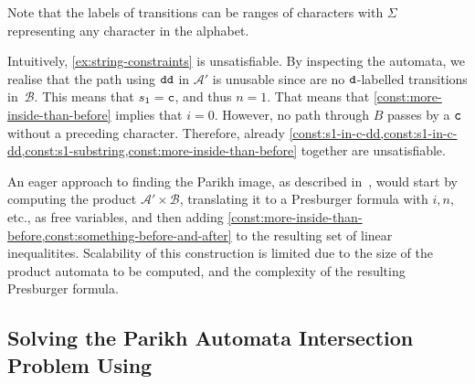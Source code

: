 Note that the labels of transitions can be ranges of characters with $\Sigma$
representing any character in the alphabet.

Intuitively, \cref{ex:string-constraints} is unsatisfiable. By inspecting the
automata, we realise that the path using $\texttt{dd}$ in $\mathcal{A}'$ is unusable since
are no $\texttt{d}$-labelled transitions in~$\mathcal{B}$. This means that $s_1 = \texttt{c}$,
and thus $n = 1$. That means that \cref{const:more-inside-than-before} implies
that $i = 0$. However, no path through $B$ passes by a $\texttt{c}$ without a
preceding character. Therefore, already
\cref{const:s1-in-c-dd,const:s1-in-c-dd,const:s1-substring,const:more-inside-than-before}
together are unsatisfiable.


An eager approach to finding the Parikh
image, as described in~\cite{generate-parikh-image}, would start by
computing the product $\mathcal{A}' \times \mathcal{B}$, translating it to a Presburger formula with
$i, n$, etc., as free variables, and then adding
\cref{const:more-inside-than-before,const:something-before-and-after} to the
resulting set of linear inequalitites. Scalability of this
construction is limited due to the size of the product automata to be computed,
and the complexity of the resulting Presburger formula.

\subsection{Solving the Parikh Automata Intersection Problem Using \Calculus{}}

